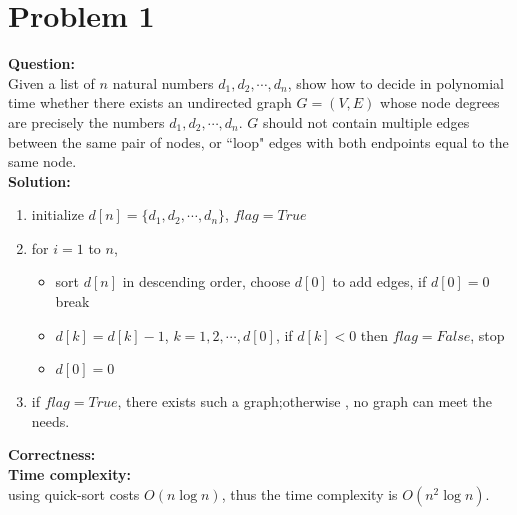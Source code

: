 \section{Problem 1}
\textbf{Question:} \\
Given a list of $n$ natural numbers $d_1,d_2,\cdots,d_n$, show how to decide in polynomial time whether there exists an undirected graph $G = (V, E)$ whose node degrees are precisely the numbers $d_1, d_2,\cdots ,d_n$. $G$ should not contain multiple edges between the same pair of nodes, or ``loop" edges with both endpoints equal to the same node. \\
\textbf{Solution:} 
\begin{enumerate}
	\item initialize $d[n] = \{d_1,d_2,\cdots,d_n\}$, $flag = True$
	\item for $i = 1$ to $n$, 
	\begin{itemize}
		\item  sort $d[n]$ in descending order, choose $d[0]$ to add edges, if $d[0] = 0$ break 
		\item  $d[k] = d[k] -1$, $k = 1,2,\cdots, d[0]$,
		if $d[k] < 0$ then $flag = False$, stop 
		\item $d[0] = 0$
	\end{itemize}
	\item if $flag = True$, there exists such a graph;otherwise , no graph can meet the needs.
\end{enumerate}
\textbf{Correctness:} \\
\textbf{Time complexity:}\\
using quick-sort costs $O(n\log n)$, thus the time complexity is $O(n^2 \log n)$.